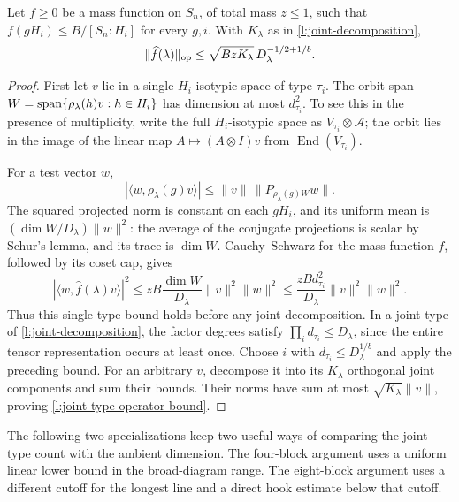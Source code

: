 \begin{theorem}
\label{l:joint-type-operator}
Let $f\ge0$ be a mass function on $S_n$, of total mass $z\le1$,
such that $f(gH_i)\le B/[S_n:H_i]$ for every $g,i$.  With
$K_\lambda$ as in \eqref{l:joint-decomposition},
\begin{equation}\label{l:joint-type-operator-bound}
 \|\widehat f(\lambda)\|_{\mathrm{op}}
       \le\sqrt{BzK_\lambda}\,D_\lambda^{-1/2+1/b}.
\end{equation}
\end{theorem}
\begin{proof}
First let $v$ lie in a single $H_i$-isotypic space of type $\tau_i$.
The orbit span
$W=\operatorname{span}\{\rho_\lambda(h)v:h\in H_i\}$ has dimension at most
$d_{\tau_i}^2$.  To see this in the presence of multiplicity, write
the full $H_i$-isotypic space as $V_{\tau_i}\otimes\mathcal A$;
the orbit lies in the image of the linear map
$A\mapsto(A\otimes I)v$ from $\operatorname{End}(V_{\tau_i})$.

For a test vector $w$,
\[
 |\langle w,\rho_\lambda(g)v\rangle|
    \le\|v\|\,\|P_{\rho_\lambda(g)W}w\|.
\]
The squared projected norm is constant on each $gH_i$, and its
uniform mean is $(\dim W/D_\lambda)\|w\|^2$: the average of
the conjugate projections is scalar by Schur's lemma, and its trace
is $\dim W$.  Cauchy--Schwarz for the mass function $f$, followed
by its coset cap, gives
\[
 |\langle w,\widehat f(\lambda)v\rangle|^2
 \le zB\frac{\dim W}{D_\lambda}\|v\|^2\|w\|^2
 \le\frac{zB d_{\tau_i}^2}{D_\lambda}\|v\|^2\|w\|^2.
\]
Thus this single-type bound holds before any joint decomposition.
In a joint type of \eqref{l:joint-decomposition}, the factor degrees
satisfy $\prod_i d_{\tau_i}\le D_\lambda$, since the entire tensor
representation occurs at least once.  Choose $i$ with
$d_{\tau_i}\le D_\lambda^{1/b}$ and apply the preceding bound.
For an arbitrary $v$, decompose it into its $K_\lambda$ orthogonal
joint components and sum their bounds.  Their norms have sum at
most $\sqrt{K_\lambda}\|v\|$, proving
\eqref{l:joint-type-operator-bound}.
\end{proof}

The following two specializations keep two useful ways of comparing
the joint-type count with the ambient dimension.  The four-block
argument uses a uniform linear lower bound in the broad-diagram
range.  The eight-block argument uses a different cutoff for the
longest line and a direct hook estimate below that cutoff.

